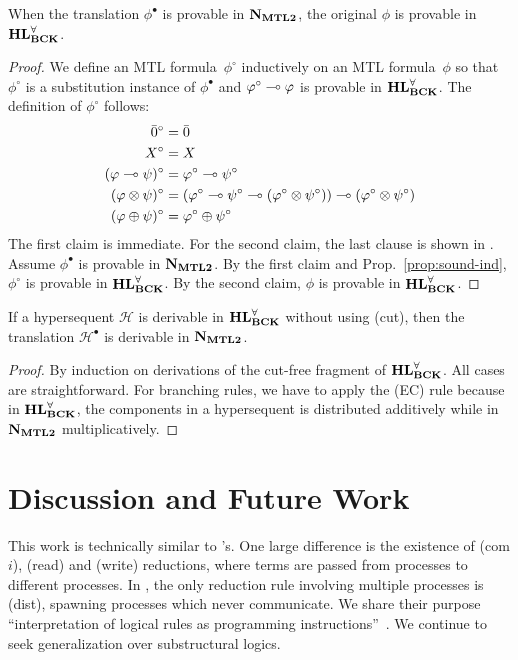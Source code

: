 \documentclass[envcountsame]{llncs}
\begin{document}
 \begin{proposition}[Soundness]
  \label{prop:sound}
  When the translation $\phi^\bullet$ is provable in $\mathbf{N}_{\mathbf{MTL2}}$, the
  original $\phi$ is provable in $\mathbf{HL}^\forall_{\mathbf{BCK}}$.
 \end{proposition}
  \begin{proof}
   We define an MTL formula~$\phi^\circ$ inductively on an MTL
   formula~$\phi$ so that $\phi^\circ$ is a substitution instance of
   $\phi^\bullet$ and $\varphi^\circ\multimap\varphi$ is provable in
   $\mathbf{HL}^\forall_{\mathbf{BCK}}$.
   The definition of $\phi^\circ$ follows:
   \begin{align*}
    \bar 0^\circ&= \bar 0\\
    X^\circ &=X \\
    (\varphi\multimap\psi)^\circ&=\varphi^\circ\multimap\psi^\circ\\
    (\varphi\otimes\psi)^\circ &=
    (\varphi^\circ\multimap\psi^\circ\multimap(\varphi^\circ\otimes\psi^\circ))\multimap(\varphi^\circ\otimes\psi^\circ)\\
    (\varphi\oplus\psi)^\circ &= \varphi^\circ \oplus \psi^\circ
   \end{align*}
   The first claim is immediate.  For the second claim, the last clause
   is shown in \citep[Lem.~6.5]{Cintula200740}.  Assume $\phi^\bullet$
   is provable in $\mathbf{N}_{\mathbf{MTL2}}$.  By the first claim and Prop.~\ref{prop:sound-ind},
   $\phi^\circ$ is provable in $\mathbf{HL}^\forall_{\mathbf{BCK}}$.  By the second claim, $\phi$ is
   provable in $\mathbf{HL}^\forall_{\mathbf{BCK}}$.
  \end{proof}

\begin{proposition}[Completeness]
 \label{prop:comp}
 If a hypersequent $\mathcal H$ is
 derivable in $\mathbf{HL}^\forall_{\mathbf{BCK}}$ without using (cut), then the translation $\mathcal H^\bullet$ is
 derivable in $\mathbf{N}_{\mathbf{MTL2}}$.
\end{proposition}
\begin{proof}
 By induction on derivations of the cut-free fragment of $\mathbf{HL}^\forall_{\mathbf{BCK}}$.
 All cases are straightforward.  For branching rules, we have to apply
 the (EC) rule because in $\mathbf{HL}^\forall_{\mathbf{BCK}}$, the components in a hypersequent is distributed
 additively while in $\mathbf{N}_{\mathbf{MTL2}}$ multiplicatively.
\end{proof}

\section{Discussion and Future Work}
\label{sec:discuss}
This work is technically similar to \citet{danos-krivine}'s.
One large difference is the existence of (com$i$), (read) and (write)
reductions, where terms are passed from processes to different
processes.
In \citet{danos-krivine}, the only reduction rule involving multiple
processes is (dist), spawning processes which never communicate.
We share their purpose
``interpretation of logical rules as programming
instructions''~\citep{danos-krivine}.
We continue to seek generalization over substructural
logics.
\end{document}
